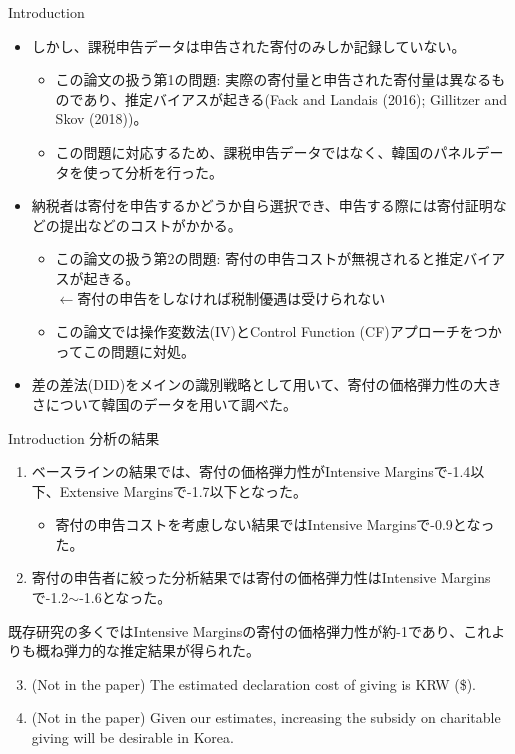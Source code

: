 \documentclass[dvipdfmx,10pt]{beamer}
\begin{document}
	\begin{frame}{Introduction}
		\protect\hypertarget{introduction-1}{}
		\begin{itemize}
			\item しかし、課税申告データは申告された寄付のみしか記録していない。
			\begin{itemize}
				\item この論文の扱う第1の問題: 実際の寄付量と申告された寄付量は異なるものであり、推定バイアスが起きる(Fack and Landais (2016); Gillitzer and Skov (2018))。
				\item この問題に対応するため、課税申告データではなく、韓国のパネルデータを使って分析を行った。
			\end{itemize}
			\item 納税者は寄付を申告するかどうか自ら選択でき、申告する際には寄付証明などの提出などのコストがかかる。			
			\begin{itemize}
				\item この論文の扱う第2の問題: 寄付の申告コストが無視されると推定バイアスが起きる。\\
				$\leftarrow$寄付の申告をしなければ税制優遇は受けられない
				\item この論文では操作変数法(IV)とControl Function (CF)アプローチをつかってこの問題に対処。
			\end{itemize}
			\item 差の差法(DID)をメインの識別戦略として用いて、寄付の価格弾力性の大きさについて韓国のデータを用いて調べた。
		\end{itemize}
	\end{frame}
	
	\begin{frame}{Introduction}
		\protect\hypertarget{introduction-2}{}
		分析の結果
		\begin{enumerate}
			\item ベースラインの結果では、寄付の価格弾力性がIntensive Marginsで-1.4以下、Extensive Marginsで-1.7以下となった。
			\begin{itemize}
				\item 寄付の申告コストを考慮しない結果ではIntensive Marginsで-0.9となった。
			\end{itemize}
			\item 寄付の申告者に絞った分析結果では寄付の価格弾力性はIntensive Marginsで-1.2\(\sim\)-1.6となった。
		\end{enumerate}
		既存研究の多くではIntensive Marginsの寄付の価格弾力性が約-1であり、これよりも概ね弾力的な推定結果が得られた。
		\begin{enumerate}
			\setcounter{enumi}{2}
			\item (Not in the paper) The estimated declaration cost of giving is KRW (\$).
			\item
			(Not in the paper) Given our estimates, increasing the subsidy on charitable giving will be desirable in Korea.
		\end{enumerate}
	\end{frame}
	
\end{document}
